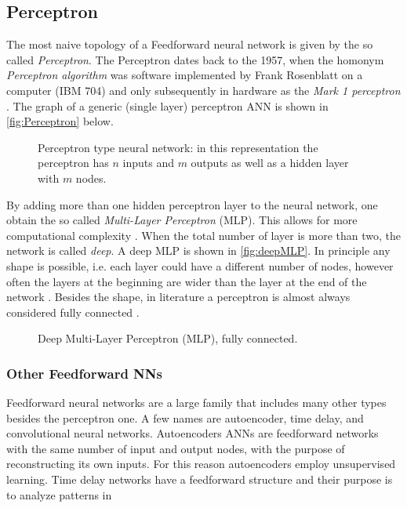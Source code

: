 \subsection{Perceptron}
\label{ssec:Perceptron}

The most naive topology of a Feedforward neural network is given by the so called \textit{Perceptron}.
The Perceptron dates back to the 1957, when the homonym \textit{Perceptron algorithm} was software implemented by Frank Rosenblatt on a computer (IBM 704) and only subsequently in hardware as the \textit{Mark 1 perceptron} \cite{frank1957perceptron,Rosenblatt1958}.
The graph of a generic (single layer) perceptron ANN is shown in \autoref{fig:Perceptron} below.

\begin{figure}[ht]
	\centering
	
	\caption{%
		Perceptron type neural network: in this representation the perceptron has $n$ inputs and $m$ outputs as well as a hidden layer with $m$ nodes. %
		}
	\label{fig:Perceptron}
\end{figure}

By adding more than one hidden perceptron layer to the neural network, one obtain the so called \textit{Multi-Layer Perceptron} (MLP).
This allows for more computational complexity \cite{??}.
When the total number of layer is more than two, the network is called \textit{deep}.
A deep MLP is shown in \autoref{fig:deepMLP}.
In principle any shape is possible, i.e. each layer could have a different number of nodes, however often the layers at the beginning are wider than the layer at the end of the network \cite{??}.
Besides the shape, in literature a perceptron is almost always considered fully connected \cite{??}.

\begin{figure}[ht]
	\centering
	
	\caption{	Deep Multi-Layer Perceptron (MLP), fully connected.}
	\label{fig:deepMLP}
\end{figure}

\subsubsection{Other Feedforward NNs}
\label{sssec:Other_Feedforward_NNs}

Feedforward neural networks are a large family that includes many other types besides the perceptron one.
A few names are autoencoder, time delay, and convolutional neural networks.
Autoencoders ANNs are feedforward networks with the same number of input and output nodes, with the purpose of reconstructing its own inputs.
For this reason autoencoders employ unsupervised learning.
Time delay networks have a feedforward structure and their purpose is to analyze patterns in

